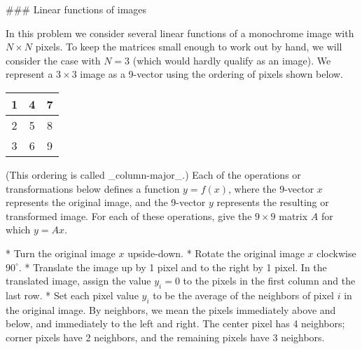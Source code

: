 ### Linear functions of images

In this problem we consider several linear functions of a monochrome image with \(N\times N\) pixels. To keep the matrices small enough to work out by hand, we will consider the case with \(N=3\) (which would hardly qualify as an image). We represent a \(3\times 3\) image as a 9-vector using the ordering of pixels shown below.

\begin{tabular}{|c|c|c|} \hline
1 & 4 & 7 \\ \hline
2 & 5 & 8 \\ \hline
3 & 6 & 9 \\ \hline \end{tabular} (This ordering is called _column-major_.) Each of the operations or transformations below defines a function \(y=f(x)\), where the 9-vector \(x\) represents the original image, and the 9-vector \(y\) represents the resulting or transformed image. For each of these operations, give the \(9\times 9\) matrix \(A\) for which \(y=Ax\).

* Turn the original image \(x\) upside-down.
* Rotate the original image \(x\) clockwise \(90^{\circ}\).
* Translate the image up by 1 pixel and to the right by 1 pixel. In the translated image, assign the value \(y_{i}=0\) to the pixels in the first column and the last row.
* Set each pixel value \(y_{i}\) to be the average of the neighbors of pixel \(i\) in the original image. By neighbors, we mean the pixels immediately above and below, and immediately to the left and right. The center pixel has 4 neighbors; corner pixels have 2 neighbors, and the remaining pixels have 3 neighbors.

